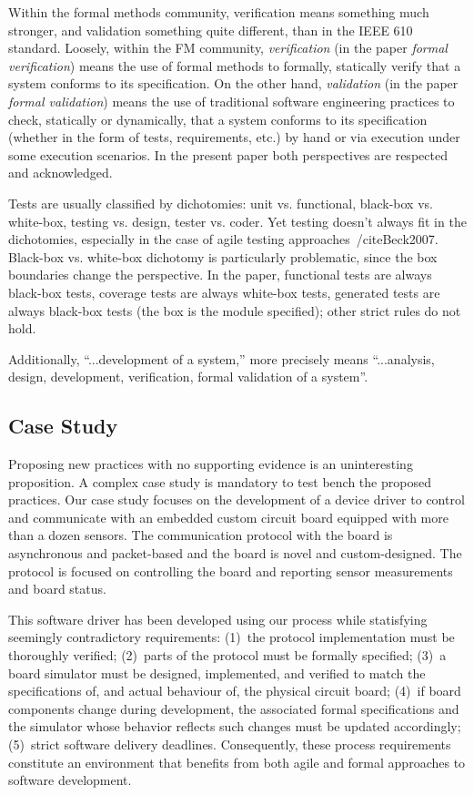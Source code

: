 \documentclass{article}
\begin{document}
Within the formal methods community, verification means something much stronger, and validation something quite different, than in the IEEE 610 standard.
Loosely, within the FM community, \emph{verification} (in the paper \emph{formal verification}) means the use of formal methods to formally, statically verify that a system conforms to its specification.
On the other hand, \emph{validation} (in the paper \emph{formal validation}) means the use of traditional software engineering practices to check, statically or dynamically, that a system conforms to its specification (whether in the form of tests, requirements, etc.) by hand or via execution under some execution scenarios.
In the present paper both perspectives are respected and acknowledged.

Tests are usually classified by dichotomies: unit vs. functional, black-box vs. white-box, testing vs. design, tester vs. coder. 
Yet testing doesn’t always fit in the dichotomies, especially in the case of agile testing approaches~/cite{Beck2007}.
Black-box vs. white-box dichotomy is particularly problematic, since the box boundaries change the perspective.
In the paper, functional tests are always black-box tests, coverage tests are always white-box tests, generated tests are always black-box tests (the box is the module specified); other strict rules do not hold.

Additionally, ``...development of a system,'' more precisely means ``...analysis, design, development, verification, formal validation of a system''.



\subsection{Case Study}
\label{sec:case-study}

Proposing new practices with no supporting evidence is an uninteresting proposition.  
A complex case study is mandatory to test bench the proposed practices.  
Our case study focuses on the development of a device driver to control and communicate with an embedded custom circuit board equipped with more than a dozen sensors.
The communication protocol with the board is asynchronous and packet-based and the board is novel and custom-designed.  
The protocol is focused on controlling the board and reporting sensor measurements and board status.

This software driver has been developed using our process while statisfying seemingly contradictory requirements: (1)~the protocol implementation must be thoroughly verified; (2)~parts of the protocol must be formally specified; (3)~a board simulator must be designed, implemented, and verified to match the specifications of, and actual behaviour of, the physical circuit board; (4)~if board components change during development, the associated formal specifications and the simulator whose behavior reflects such changes must be updated accordingly; (5)~strict software delivery deadlines.  
Consequently, these process requirements constitute an environment that benefits from both agile and formal approaches to software development.
\end{document}
